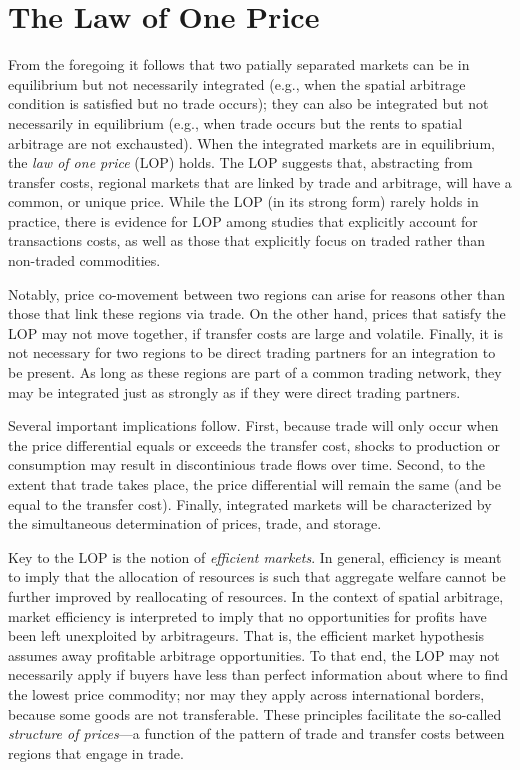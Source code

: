 \documentclass[]{book}
\begin{document}
\section{The Law of One Price}\label{the-law-of-one-price}

From the foregoing it follows that two patially separated markets can be
in equilibrium but not necessarily integrated (e.g., when the spatial
arbitrage condition is satisfied but no trade occurs); they can also be
integrated but not necessarily in equilibrium (e.g., when trade occurs
but the rents to spatial arbitrage are not exchausted). When the
integrated markets are in equilibrium, the \emph{law of one price} (LOP)
holds. The LOP suggests that, abstracting from transfer costs, regional
markets that are linked by trade and arbitrage, will have a common, or
unique price. While the LOP (in its strong form) rarely holds in
practice, there is evidence for LOP among studies that explicitly
account for transactions costs, as well as those that explicitly focus
on traded rather than non-traded commodities.

Notably, price co-movement between two regions can arise for reasons
other than those that link these regions via trade. On the other hand,
prices that satisfy the LOP may not move together, if transfer costs are
large and volatile. Finally, it is not necessary for two regions to be
direct trading partners for an integration to be present. As long as
these regions are part of a common trading network, they may be
integrated just as strongly as if they were direct trading partners.

Several important implications follow. First, because trade will only
occur when the price differential equals or exceeds the transfer cost,
shocks to production or consumption may result in discontinious trade
flows over time. Second, to the extent that trade takes place, the price
differential will remain the same (and be equal to the transfer cost).
Finally, integrated markets will be characterized by the simultaneous
determination of prices, trade, and storage.

Key to the LOP is the notion of \emph{efficient markets}. In general,
efficiency is meant to imply that the allocation of resources is such
that aggregate welfare cannot be further improved by reallocating of
resources. In the context of spatial arbitrage, market efficiency is
interpreted to imply that no opportunities for profits have been left
unexploited by arbitrageurs. That is, the efficient market hypothesis
assumes away profitable arbitrage opportunities. To that end, the LOP
may not necessarily apply if buyers have less than perfect information
about where to find the lowest price commodity; nor may they apply
across international borders, because some goods are not transferable.
These principles facilitate the so-called \emph{structure of prices}---a
function of the pattern of trade and transfer costs between regions that
engage in trade.
\end{document}
